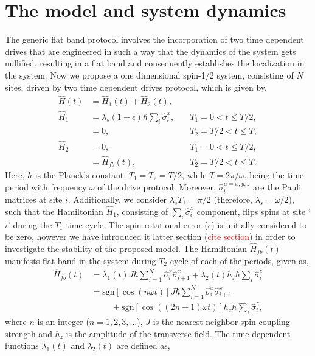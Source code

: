 \documentclass[%
reprint,
superscriptaddress,
amsmath,amssymb,
aps,
prb,
showkeys,
]{revtex4-2}
\newcommand{\red}[1]{\textcolor{red}{#1}}
\begin{document}
\section{The model and system dynamics}
 The generic flat band protocol involves the incorporation of two time dependent drives that are engineered in such a way that the dynamics of the system gets nullified, resulting in a flat band and consequently establishes the localization in the system. Now we propose a one dimensional spin-1/2 system, consisting of $N$ sites, driven by two time dependent drives protocol, which is given by,
\begin{align}
    \hat{H}(t) &= \hat{H}_1(t) + \hat{H}_2(t),\\
    \hat{H}_1 &= \lambda_s (1-\epsilon) \hbar \sum_i \hat{\sigma}^x_i, &\quad T_1 = 0<t \le T/2, \\
            &= 0, &\quad T_2 = T/2<t \le T, \\
    \hat{H}_2 &= 0, &\quad T_1 = 0<t \le T/2, \\
     &= \hat{H}_{fb}(t), &\quad T_2  = T/2<t \le T.
\end{align}
Here, $\hbar$ is the Planck's constant, $T_1 = T_2 =T/2$, while $T = 2\pi/\omega$, being the time period with frequency $\omega$ of the drive protocol. Moreover, $\hat{\sigma}^{\mu=x,y,z}_i$ are the Pauli matrices at site $i$. Additionally, we consider $\lambda_s T_1 = \pi/2$ (therefore, $\lambda_s=\omega/2$), such that the Hamiltonian $\hat{H}_1$, consisting of $\displaystyle \sum_i \hat{\sigma}^x_i$ component, flips spins at site `$i$' during the $T_1$ time cycle. The spin rotational error ($\epsilon$) is initially considered to be zero, however we have introduced it latter section (\red{cite section}) in order to investigate the stability of the proposed model. The Hamiltonian $\hat{H}_{fb}(t)$ manifests flat band in the system during $T_2$ cycle of each of the periods, given as,
\begin{align}
    \hat{H}_{fb}(t) &= \lambda_1 (t) J \hbar\sum_{i=1}^{N} \hat{\sigma}_i^x \hat{\sigma}_{i+1}^x + \lambda_2 (t) h_z \hbar \sum_i \hat{\sigma}_i^z\\
     &= \mathrm{sgn}[\cos(n\omega t)] J \hbar\sum_{i=1}^{N} \hat{\sigma}_i^x \hat{\sigma}_{i+1}^x\nonumber\\
	 & \hspace{1cm} + \mathrm{sgn}[\cos((2n+1)\omega t)] h_z \hbar\sum_i \hat{\sigma}_i^z ,
\end{align}
where $n$ is an integer ($n = 1, 2, 3, \dots$), $J$ is the nearest neighbor spin coupling strength and $h_z$ is the amplitude of the transverse field. The time dependent functions $\lambda_1(t)$ and $\lambda_2(t)$ are defined as,
\end{document}
